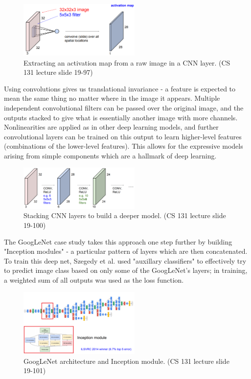 ﻿\documentclass{article}
\begin{document}
\begin{figure}[h]
\includegraphics[width=6cm]{Activation_map.png}
\centering
\caption{Extracting an activation map from a raw image in a CNN layer. (CS 131 lecture slide 19-97)}
\end{figure}

 Using convolutions gives us translational invariance - a feature is expected to mean the same thing no matter where in the image it appears. Multiple independent convolutional filters can be passed over the original image, and the outputs stacked to give what is essentially another image with more channels. Nonlinearities are applied as in other deep learning models, and further convolutional layers can be trained on this output to learn higher-level features (combinations of the lower-level features). This allows for the expressive models arising from simple components which are a hallmark of deep learning.
 
\begin{figure}[h]
\includegraphics[width=6cm]{CNN_stacking.png}
\centering
\caption{Stacking CNN layers to build a deeper model. (CS 131 lecture slide 19-100)}
\end{figure}



The GoogLeNet case study takes this approach one step further by building "Inception modules" - a particular pattern of layers which are then concatenated. To train this deep net, Szegedy et al. \cite{DBLP:journals/corr/SzegedyLJSRAEVR14} used "auxillary classifiers" to effectively try to predict image class based on only some of the GoogLeNet's layers; in training, a weighted sum of all outputs was used as the loss function.

\begin{figure}[h]
\includegraphics[width=6cm]{Inception.png}
\centering
\caption{GoogLeNet architecture and Inception module. (CS 131 lecture slide 19-101)}
\end{figure}
\end{document}
